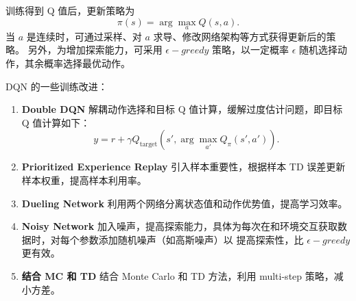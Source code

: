 训练得到 Q 值后，更新策略为
\begin{equation}
    \pi(s) = \arg\max_{a} Q(s, a).
\end{equation}
当 $a$ 是连续时，可通过采样、对 $a$ 求导、修改网络架构等方式获得更新后的策略。
另外，为增加探索能力，可采用 $\epsilon-greedy$ 策略，以一定概率 $\epsilon$ 随机选择动作，其余概率选择最优动作。

DQN 的一些训练改进：
\begin{enumerate}
    \item \textbf{Double DQN} 解耦动作选择和目标 Q 值计算，缓解过度估计问题，即目标 Q 值计算如下：
    \begin{equation}
        y = r + \gamma Q_{\text{target}}(s', \arg\max_{a'} Q_{\pi}(s', a')).
    \end{equation}
    \item \textbf{Prioritized Experience Replay} 引入样本重要性，根据样本 TD 误差更新样本权重，提高样本利用率。
    \item \textbf{Dueling Network} 利用两个网络分离状态值和动作优势值，提高学习效率。
    \item \textbf{Noisy Network} 加入噪声，提高探索能力，具体为每次在和环境交互获取数据时，对每个参数添加随机噪声（如高斯噪声）以
    提高探索性，比 $\epsilon-greedy$ 更有效。
    \item \textbf{结合 MC 和 TD} 结合 Monte Carlo 和 TD 方法，利用 multi-step 策略，减小方差。
\end{enumerate}



